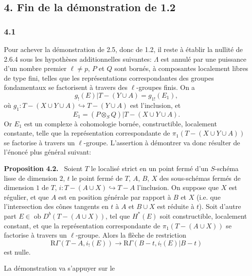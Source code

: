 \documentclass[11pt]{article}
\newenvironment{statement}[1]{\par\medskip\noindent\textbf{#1.}\ }{\par\medskip}
\newcommand{\R}{\mathrm{R}}\newcommand{\RHomCore}{\mathrm{RHom}}
\providecommand{\Ob}{\operatorname{ob}}
\providecommand{\Ob}{\operatorname{ob}}
\providecommand{\R}{\mathrm R}
\providecommand{\Ob}{\operatorname{Ob}}
\providecommand{\Ob}{\operatorname{ob}}
\providecommand{\Ob}{\operatorname{Ob}}
\begin{document}
\subsection*{4. Fin de la démonstration de 1.2}

\subsubsection*{4.1}
Pour achever la démonstration de 2.5, donc de 1.2, il reste à établir la nullité de 2.6.4 sous les hypothèses additionnelles suivantes: $\Lambda$ est annulé par une puissance d'un nombre premier $\ell\ne p$, $P$ et $Q$ sont bornés, à composantes localement libres de type fini, telles que les représentations correspondantes des groupes fondamentaux se factorisent à travers des $\ell$-groupes finis. On a
\[
g_!(E)|T-(Y\cup A)=g_{1!}(E_1),
\]
où $g_1:T-(X\cup Y\cup A)\hookrightarrow T-(Y\cup A)$ est l'inclusion, et
\[
E_1=(P\otimes_S Q)|T-(X\cup Y\cup A).
\]
Or $E_1$ est un complexe à cohomologie bornée, constructible, localement constante, telle que la représentation correspondante de $\pi_1(T-(X\cup Y\cup A))$ se factorise à travers un $\ell$-groupe. L'assertion à démontrer va donc résulter de l'énoncé plus général suivant:

\begin{statement}{Proposition 4.2}
Soient $T$ le localisé strict en un point fermé d'un $S$-schéma lisse de dimension $2$, $t$ le point fermé de $T$, $A$, $B$, $X$ des sous-schémas fermés de dimension $1$ de $T$, $i:T-(A\cup X)\hookrightarrow T-A$ l'inclusion. On suppose que $X$ est régulier, et que $A$ est en position générale par rapport à $B$ et $X$ (i.e. que l'intersection des cônes tangents en $t$ à $A$ et $B\cup X$ est réduite à $t$). Soit d'autre part $E\in\Ob D^b(T-(A\cup X))$, tel que $H^*(E)$ soit constructible, localement constant, et que la représentation correspondante de $\pi_1(T-(A\cup X))$ se factorise à travers un $\ell$-groupe. Alors la flèche de restriction
\[
\R\Gamma(T-A,i_!(E))
\longrightarrow
\R\Gamma(B-t,i_!(E)|B-t)
\]
est nulle.
\end{statement}

La démonstration va s'appuyer sur le
\end{document}
